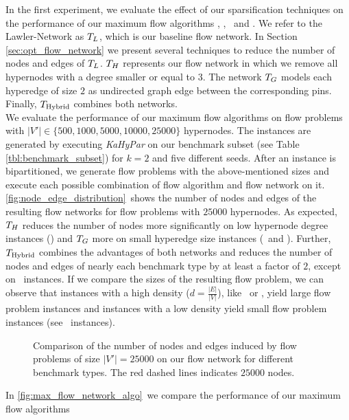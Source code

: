 In the first experiment, we evaluate the effect of our sparsification techniques
on the performance of our maximum flow algorithms \EdmondKarp, \GoldbergTarjan, \BoykovKolmogorov~and \IBFS. 
We refer to the Lawler-Network as $T_L$, which is our baseline flow network. In
Section \ref{sec:opt_flow_network} we present several techniques to reduce the number
of nodes and edges of $T_L$. $T_H$ represents our flow network in which
we remove all hypernodes with a degree smaller or equal to $3$. The network $T_G$ models
each hyperedge of size $2$ as undirected graph edge between the corresponding pins. Finally,
$T_{\text{Hybrid}}$ combines both networks. \\
We evaluate the performance of our maximum flow algorithms on flow problems with
$|V'| \in \{500,1000,5000,10000,25000\}$ hypernodes. The instances are generated by executing
\emph{KaHyPar} on our benchmark subset (see Table \ref{tbl:benchmark_subset}) for $k = 2$ and five different 
seeds. After an instance is bipartitioned, we generate flow problems
with the above-mentioned sizes and execute each possible combination of flow algorithm and
flow network on it. \\
\autoref{fig:node_edge_distribution}~shows the number of nodes and edges
of the resulting flow networks for flow problems with $25000$ hypernodes. As expected,
$T_H$ reduces the number of nodes more significantly on low hypernode degree
instances (\Dual) and $T_G$ more on small hyperedge size instances
(\Primal~and \Literal). Further, $T_{\text{Hybrid}}$ combines the advantages of both networks
and reduces the number of nodes and edges of nearly each benchmark type by at least a factor of $2$,
except on \SPM~instances. If we compare the sizes of the resulting flow problem, we can observe
that instances with a high density ($d = \frac{|E|}{|V|}$), like \Primal~or \Literal, yield large flow problem 
instances and instances with a low density yield small flow problem
instances (see \Dual~instances). \\
\begin{figure}[ht!]
\centering
\caption{Comparison of the number of nodes and edges induced by flow problems 
         of size $|V'| = 25000$ on our flow network for different benchmark types.
         The red dashed lines indicates $25000$ nodes.}
\label{fig:node_edge_distribution}
\end{figure} 
In \autoref{fig:max_flow_network_algo}~we compare the performance of our maximum flow algorithms
